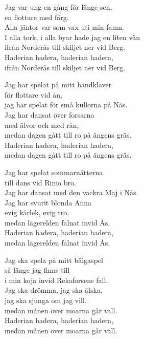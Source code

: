 \vspace{10pt}
Jag var ung en gång för länge sen,\\
en flottare med färg.\\
Alla jäntor var som vax uti min famn.\\
I alla tork, i alla byar hade jag en liten vän\\
ifrån Norderås till skiljet ner vid Berg.\\
Haderian hadera, haderian hadera,\\
ifrån Norderås till skiljet ner vid Berg.\par
\vspace{10pt}
Jag har spelat på mitt handklaver\\
för flottare vid ån,\\
jag har spelat för små kullorna på Näs.\\
Jag har dansat över forsarna\\
med älvor och med rån,\\
medan dagen gått till ro på ängens gräs.\\
Haderian hadera, haderian hadera,\\
medan dagen gått till ro på ängens gräs.\par
\newpage
Jag har spelat sommarnätterna\\
till dans vid Rimo bro.\\
Jag har dansat med den vackra Maj i Nås.\\
Jag har svurit blonda Anna\\
evig kärlek, evig tro,\\
medan lägerelden falnat invid Ås.\\
Haderian hadera, haderian hadera,\\
medan lägerelden falnat invid Ås.\par
\vspace{10pt}
Jag ska spela på mitt bälgaspel\\
så länge jag finns till\\
i min koja invid Rekaforsens fall.\\
Jag ska drömma, jag ska älska,\\
jag ska sjunga om jag vill,\\
medan månen över moarna går vall.\\
Haderian hadera, haderian hadera,\\
medan månen över moarna går vall.
